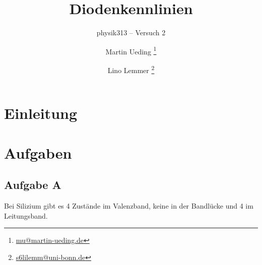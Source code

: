 




\subject{Praktikumsprotokoll}
\title{Diodenkennlinien}
\subtitle{physik313 – Versuch 2}
\author{
	Martin Ueding \footnote{\href{mailto:mu@martin-ueding.de}{mu@martin-ueding.de}}
	\and
	Lino Lemmer \footnote{\href{mailto:s6lilemm@uni-bonn.de}{s6lilemm@uni-bonn.de}}
}



\maketitle

\tableofcontents
\newpage


\section{Einleitung}



\section{Aufgaben}

\subsection{Aufgabe A}

Bei Silizium gibt es 4 Zustände im Valenzband, keine in der Bandlücke und 4 im
Leitungsband.


